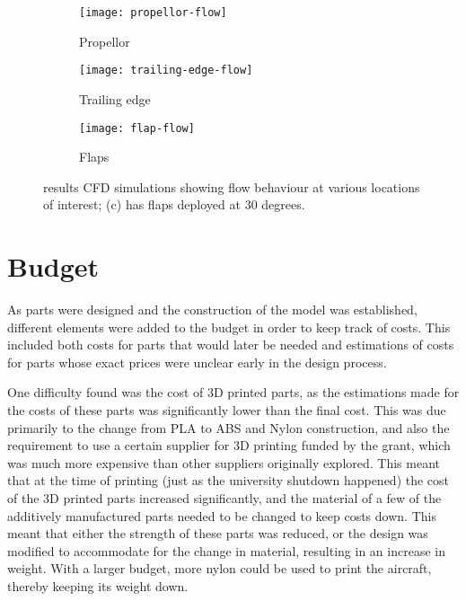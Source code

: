 \documentclass[../../main.tex]{subfiles}
\begin{document}
\begin{figure}[H]

    \centering
    \begin{subfigure}[b]{0.49\columnwidth}
        \centering
        \texttt{[image: propellor-flow]}
        \caption{Propellor}
        \label{fig:flow-behaviour:propellor}
    \end{subfigure}
    \hfill
    \begin{subfigure}[b]{0.49\columnwidth}
        \centering
        \texttt{[image: trailing-edge-flow]}
        \caption{Trailing edge}
        \label{fig:flow-behaviour:trailing-edge}
    \end{subfigure}

    \begin{subfigure}[b]{0.49\columnwidth}
        \centering
        \texttt{[image: flap-flow]}
        \caption{Flaps}
        \label{fig:flow-behaviour:flaps}
    \end{subfigure}
    
    \caption{results CFD simulations showing flow behaviour at various locations of interest; (c) has flaps deployed at 30 degrees.}
    \label{fig:flow-behaviour}
\end{figure} 

\section{Budget} \label{sec:project-review:budget}

As parts were designed and the construction of the model was established, different elements were added to the budget in order to keep track of costs.
This included both costs for parts that would later be needed and estimations of costs for parts whose exact prices were unclear early in the design process.

One difficulty found was the cost of 3D printed parts, as the estimations made for the costs of these parts was significantly lower than the final cost.
This was due primarily to the change from PLA to ABS and Nylon construction, and also the requirement to use a certain supplier for 3D printing funded by the grant, which was much more expensive than other suppliers originally explored.
This meant that at the time of printing (just as the university shutdown happened) the cost of the 3D printed parts increased significantly, and the material of a few of the additively manufactured parts needed to be changed to keep costs down.
This meant that either the strength of these parts was reduced, or the design was modified to accommodate for the change in material, resulting in an increase in weight.
With a larger budget, more nylon could be used to print the aircraft, thereby keeping its weight down. 
\end{document}
